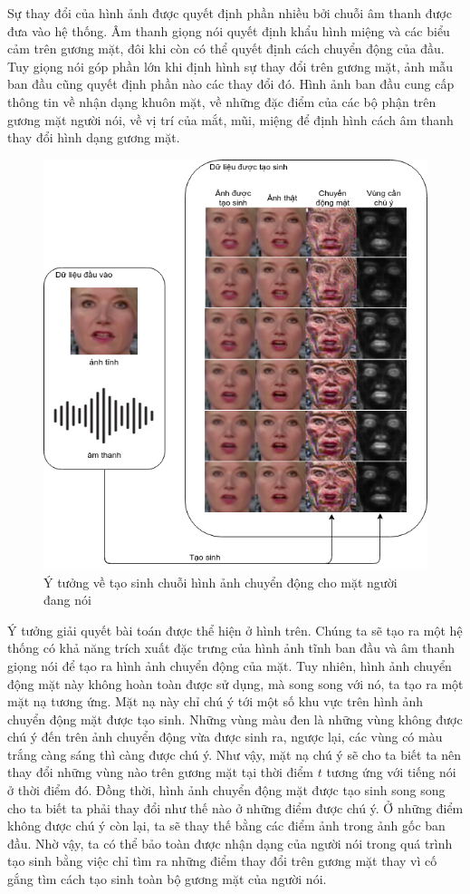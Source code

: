 Sự thay đổi của hình ảnh được quyết định phần nhiều bởi chuỗi âm thanh được đưa vào hệ thống. Âm thanh giọng nói quyết định khẩu hình miệng và các biểu cảm trên gương mặt, đôi khi còn có thể quyết định cách chuyển động của đầu. Tuy giọng nói góp phần lớn khi định hình sự thay đổi trên gương mặt, ảnh mẫu ban đầu cũng quyết định phần nào các thay đổi đó. Hình ảnh ban đầu cung cấp thông tin về nhận dạng khuôn mặt, về những đặc điểm của các bộ phận trên gương mặt người nói, về vị trí của mắt, mũi, miệng để định hình cách âm thanh thay đổi hình dạng gương mặt.

\begin{figure}[H]
    \centering
    \includegraphics[width=12cm]{./content/materials/idea.png}
    \caption{Ý tưởng về tạo sinh chuỗi hình ảnh chuyển động cho mặt người đang nói}
\end{figure}

Ý tưởng giải quyết bài toán được thể hiện ở hình trên. Chúng ta sẽ tạo ra một hệ thống có khả năng trích xuất đặc trưng của hình ảnh tĩnh ban đầu và âm thanh giọng nói để tạo ra hình ảnh chuyển động của mặt. Tuy nhiên, hình ảnh chuyển động mặt này không hoàn toàn được sử dụng, mà song song với nó, ta tạo ra một mặt nạ tương ứng. Mặt nạ này chỉ chú ý tới một số khu vực trên hình ảnh chuyển động mặt được tạo sinh. Những vùng màu đen là những vùng không được chú ý đến trên ảnh chuyển động vừa được sinh ra, ngược lại, các vùng có màu trắng càng sáng thì càng được chú ý. Như vậy, mặt nạ chú ý sẽ cho ta biết ta nên thay đổi những vùng nào trên gương mặt tại thời điểm $t$ tương ứng với tiếng nói ở thời điểm đó. Đồng thời, hình ảnh chuyển động mặt được tạo sinh song song cho ta biết ta phải thay đổi như thế nào ở những điểm được chú ý. Ở những điểm không được chú ý còn lại, ta sẽ thay thế bằng các điểm ảnh trong ảnh gốc ban đầu. Nhờ vậy, ta có thể bảo toàn được nhận dạng của người nói trong quá trình tạo sinh bằng việc chỉ tìm ra những điểm thay đổi trên gương mặt thay vì cố gắng tìm cách tạo sinh toàn bộ gương mặt của người nói.

